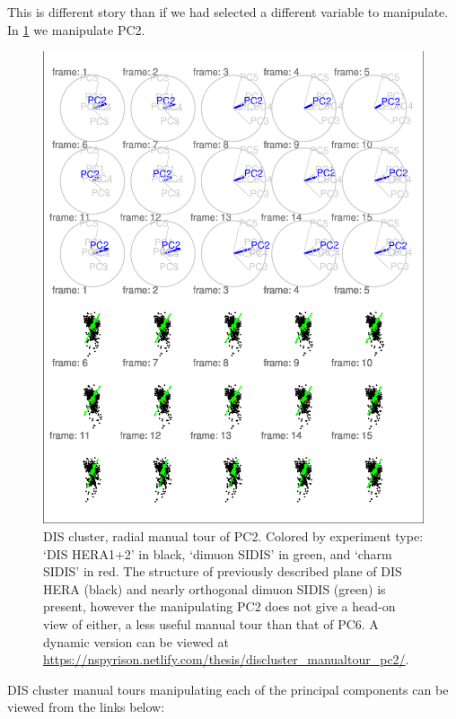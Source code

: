 \documentclass{monashthesis}
\begin{document}
This is different story than if we had selected a different variable to
manipulate. In \ref{fig:DISclusterBad} we manipulate PC2.

\begin{figure}
\centering
\includegraphics{thesis_files/figure-latex/DISclusterBad-1.pdf}
\caption{\label{fig:DISclusterBad}DIS cluster, radial manual tour of PC2.
Colored by experiment type: `DIS HERA1+2' in black, `dimuon SIDIS' in
green, and `charm SIDIS' in red. The structure of previously described
plane of DIS HERA (black) and nearly orthogonal dimuon SIDIS (green) is
present, however the manipulating PC2 does not give a head-on view of
either, a less useful manual tour than that of PC6. A dynamic version
can be viewed at
\url{https://nspyrison.netlify.com/thesis/discluster_manualtour_pc2/}.}
\end{figure}

DIS cluster manual tours manipulating each of the principal components
can be viewed from the links below:
\end{document}
